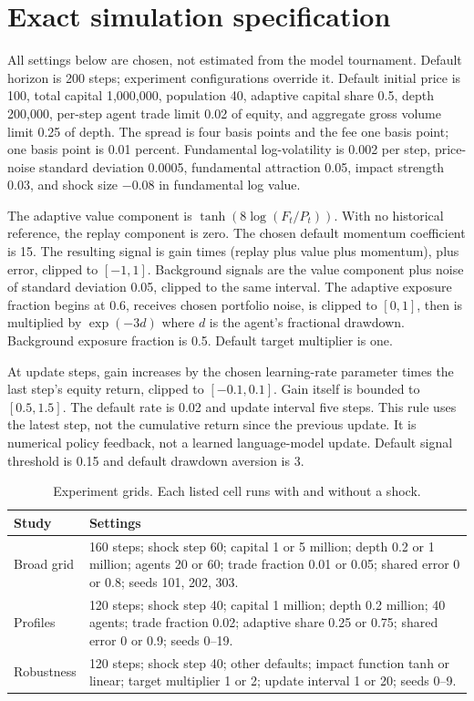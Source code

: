 \section{Exact simulation specification}
All settings below are chosen, not estimated from the model tournament. Default horizon is 200 steps; experiment configurations override it. Default initial price is 100, total capital 1,000,000, population 40, adaptive capital share 0.5, depth 200,000, per-step agent trade limit 0.02 of equity, and aggregate gross volume limit 0.25 of depth. The spread is four basis points and the fee one basis point; one basis point is 0.01 percent. Fundamental log-volatility is 0.002 per step, price-noise standard deviation 0.0005, fundamental attraction 0.05, impact strength 0.03, and shock size $-0.08$ in fundamental log value.

The adaptive value component is $\tanh(8\log(F_t/P_t))$. With no historical reference, the replay component is zero. The chosen default momentum coefficient is 15. The resulting signal is gain times (replay plus value plus momentum), plus error, clipped to $[-1,1]$. Background signals are the value component plus noise of standard deviation 0.05, clipped to the same interval. The adaptive exposure fraction begins at 0.6, receives chosen portfolio noise, is clipped to $[0,1]$, then is multiplied by $\exp(-3d)$ where $d$ is the agent's fractional drawdown. Background exposure fraction is 0.5. Default target multiplier is one.

At update steps, gain increases by the chosen learning-rate parameter times the last step's equity return, clipped to $[-0.1,0.1]$. Gain itself is bounded to $[0.5,1.5]$. The default rate is 0.02 and update interval five steps. This rule uses the latest step, not the cumulative return since the previous update. It is numerical policy feedback, not a learned language-model update. Default signal threshold is 0.15 and default drawdown aversion is 3.

\begin{table}[h]\centering
\caption{Experiment grids. Each listed cell runs with and without a shock.}
\begin{tabular}{p{.20\linewidth}p{.68\linewidth}}\toprule
Study & Settings\\\midrule
Broad grid & 160 steps; shock step 60; capital 1 or 5 million; depth 0.2 or 1 million; agents 20 or 60; trade fraction 0.01 or 0.05; shared error 0 or 0.8; seeds 101, 202, 303.\\
Profiles & 120 steps; shock step 40; capital 1 million; depth 0.2 million; 40 agents; trade fraction 0.02; adaptive share 0.25 or 0.75; shared error 0 or 0.9; seeds 0--19.\\
Robustness & 120 steps; shock step 40; other defaults; impact function tanh or linear; target multiplier 1 or 2; update interval 1 or 20; seeds 0--9.\\\bottomrule
\end{tabular}\end{table}

